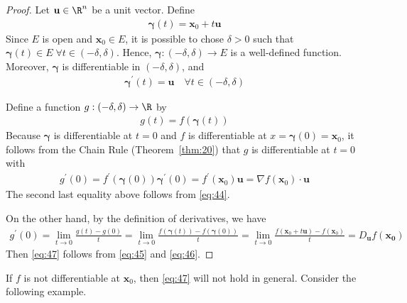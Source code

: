 \documentclass[thmcnt=section, 12pt]{elegantbook}
\begin{document}
\begin{proof}
    Let $\mathbf{u} \in \R^n$ be a unit vector. Define
    \begin{align*}
        \boldsymbol{\gamma}(t)
        = \mathbf{x}_0 + t \mathbf{u}
    \end{align*}
    Since $E$ is open and $\mathbf{x}_0 \in E$, it is possible to chose $\delta > 0$ such that $\boldsymbol{\gamma}(t) \in E \; \forall t \in (-\delta,\delta)$. Hence, $\boldsymbol{\gamma}: (-\delta,\delta) \to E$ is a well-defined function. Moreover, $\boldsymbol{\gamma}$ is differentiable in $(-\delta, \delta)$, and 
    \begin{align}
        \boldsymbol{\gamma}^\prime(t) = \mathbf{u}
        \quad \forall t \in (-\delta, \delta)
        \label{eq:44}
    \end{align}
    
    \par Define a function $g: (-\delta, \delta) \to \R$ by 
    \begin{align*}
        g(t) = f(\boldsymbol{\gamma}(t))
    \end{align*}
    Because $\boldsymbol{\gamma}$ is differentiable at $t = 0$ and $f$ is differentiable at $x = \boldsymbol{\gamma}(0) = \mathbf{x}_0$, it follows from the Chain Rule (Theorem~\ref{thm:20}) that $g$ is differentiable at $t = 0$ with 
    \begin{align}
        g^\prime(0) = f^\prime(\boldsymbol{\gamma}(0)) \boldsymbol{\gamma}^\prime(0)
        = f^\prime(\mathbf{x}_0) \mathbf{u}
        = \nabla f (\mathbf{x}_0) \cdot \mathbf{u}
        \label{eq:45}
    \end{align}
    The second last equality above follows from \eqref{eq:44}.

    \par On the other hand, by the definition of derivatives, we have 
    \begin{align}
        g^\prime(0) 
        = \lim_{t \to 0} \frac{g(t) - g(0)}{t}
        = \lim_{t \to 0} \frac{f(\boldsymbol{\gamma}(t)) - f(\boldsymbol{\gamma}(0))}{t}
        = \lim_{t \to 0} \frac{f(\mathbf{x}_0 + t \mathbf{u}) - f(\mathbf{x}_0)}{t}
        = D_{\mathbf{u}}f (\mathbf{x_0})
        \label{eq:46}
    \end{align}
    Then \eqref{eq:47} follows from \eqref{eq:45} and \eqref{eq:46}.
\end{proof}


\par If $f$ is not differentiable at $\mathbf{x}_0$, then \eqref{eq:47} will not hold in general. Consider the following example.
\end{document}
